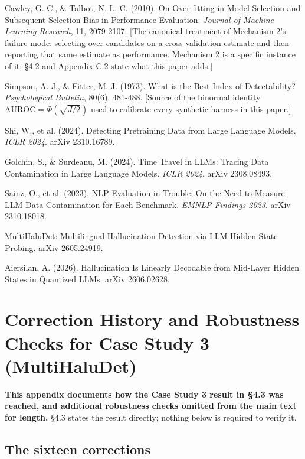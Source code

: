 \documentclass[10pt]{article} %
\begin{document}
Cawley, G. C., \& Talbot, N. L. C. (2010). On Over-fitting in Model
Selection and Subsequent Selection Bias in Performance Evaluation.
\emph{Journal of Machine Learning Research}, 11, 2079-2107. [The canonical
treatment of Mechanism 2's failure mode: selecting over candidates on a
cross-validation estimate and then reporting that same estimate as
performance. Mechanism 2 is a specific instance of it; §4.2 and Appendix
C.2 state what this paper adds.]

Simpson, A. J., \& Fitter, M. J. (1973). What is the Best Index of
Detectability? \emph{Psychological Bulletin}, 80(6), 481-488. [Source of
the binormal identity $\text{AUROC}=\Phi(\sqrt{J/2})$ used to calibrate
every synthetic harness in this paper.]

Shi, W., et al. (2024). Detecting Pretraining Data from Large Language
Models. \emph{ICLR 2024}. arXiv 2310.16789.

Golchin, S., \& Surdeanu, M. (2024). Time Travel in LLMs: Tracing Data
Contamination in Large Language Models. \emph{ICLR 2024}. arXiv 2308.08493.

Sainz, O., et al. (2023). NLP Evaluation in Trouble: On the Need to
Measure LLM Data Contamination for Each Benchmark. \emph{EMNLP Findings
2023}. arXiv 2310.18018.

MultiHaluDet: Multilingual Hallucination Detection via LLM Hidden State
Probing. arXiv 2605.24919.

Aiersilan, A. (2026). Hallucination Is Linearly Decodable from
Mid-Layer Hidden States in Quantized LLMs. arXiv 2606.02628.

\appendix

\section{Correction History and Robustness Checks for Case Study 3 (MultiHaluDet)}

\textbf{This appendix documents how the Case Study 3 result in §4.3 was
reached, and additional robustness checks omitted from the main text for
length.} §4.3 states the result directly; nothing below is required to
verify it.

\subsection{The sixteen corrections}
\end{document}
